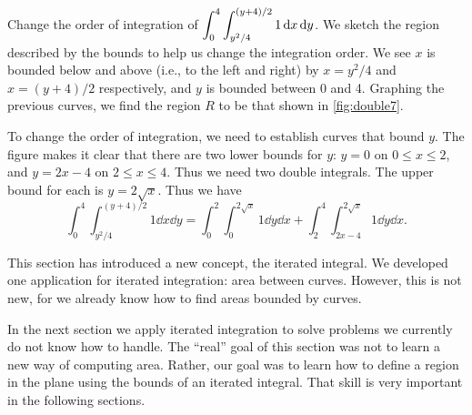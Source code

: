 \begin{example}\label{ex_double7}%
Change the order of integration of $\displaystyle\int_0^4\int_{y^2/4}^{(y+4)/2}1\operatorname{d}\! x\operatorname{d}\! y$.
\solution
We sketch the region described by the bounds to help us change the integration order. We see $x$ is bounded below and above (i.e., to the left and right) by $x=y^2/4$ and $x=(y+4)/2$ respectively, and $y$ is bounded between 0 and 4. Graphing the previous curves, we find the region $R$ to be that shown in \autoref{fig:double7}.


To change the order of integration, we need to establish curves that bound $y$. The figure makes it clear that there are two lower bounds for $y$: $y=0$ on $0\leq x\leq 2$, and $y=2x-4$ on $2\leq x\leq 4$. Thus we need two double integrals. The upper bound for each is $y=2\sqrt{x}$. Thus we have
\[
\int_0^4\int_{y^2/4}^{(y+4)/2}1\dd x\dd y
= \int_0^2\int_0^{2\sqrt{x}} 1\dd y\dd x + \int_2^4\int_{2x-4}^{2\sqrt{x}}1\dd y\dd x.
\]
\end{example}

This section has introduced a new concept, the iterated integral. We developed one application for iterated integration: area between curves. However, this is not new, for we already know how to find areas bounded by curves.

In the next section we apply iterated integration to solve problems we currently do not know how to handle. The ``real'' goal of this section was not to learn a new way of computing area. Rather, our goal was to learn how to define a region in the plane using the bounds of an iterated integral. That skill is very important in the following sections.


